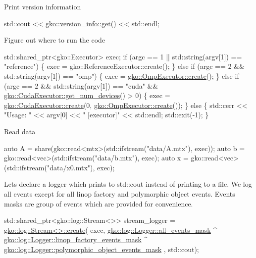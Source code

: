 Print version information


\begin{DoxyCode}
std::cout << \hyperlink{classgko_1_1version__info_a6daeb8a087cfb57fa055526fc133d8eb}{gko::version\_info::get}() << std::endl;
\end{DoxyCode}


Figure out where to run the code


\begin{DoxyCode}
std::shared\_ptr<gko::Executor> exec;
\textcolor{keywordflow}{if} (argc == 1 || std::string(argv[1]) == \textcolor{stringliteral}{"reference"}) \{
    exec = gko::ReferenceExecutor::create();
\} \textcolor{keywordflow}{else} \textcolor{keywordflow}{if} (argc == 2 && std::string(argv[1]) == \textcolor{stringliteral}{"omp"}) \{
    exec = \hyperlink{classgko_1_1OmpExecutor_a33ca05fdd0fc928ee262fc9425304874}{gko::OmpExecutor::create}();
\} \textcolor{keywordflow}{else} \textcolor{keywordflow}{if} (argc == 2 && std::string(argv[1]) == \textcolor{stringliteral}{"cuda"} &&
           \hyperlink{classgko_1_1CudaExecutor_aef0258494d14de0e56149b920c5173e5}{gko::CudaExecutor::get\_num\_devices}() > 0) \{
    exec = \hyperlink{classgko_1_1CudaExecutor_a2718a92034350650ef406ffdb60db090}{gko::CudaExecutor::create}(0, 
      \hyperlink{classgko_1_1OmpExecutor_a33ca05fdd0fc928ee262fc9425304874}{gko::OmpExecutor::create}());
\} \textcolor{keywordflow}{else} \{
    std::cerr << \textcolor{stringliteral}{"Usage: "} << argv[0] << \textcolor{stringliteral}{" [executor]"} << std::endl;
    std::exit(-1);
\}
\end{DoxyCode}


Read data


\begin{DoxyCode}
\textcolor{keyword}{auto} A = share(gko::read<mtx>(std::ifstream(\textcolor{stringliteral}{"data/A.mtx"}), exec));
\textcolor{keyword}{auto} b = gko::read<vec>(std::ifstream(\textcolor{stringliteral}{"data/b.mtx"}), exec);
\textcolor{keyword}{auto} x = gko::read<vec>(std::ifstream(\textcolor{stringliteral}{"data/x0.mtx"}), exec);
\end{DoxyCode}


Let\textquotesingle{}s declare a logger which prints to std\+::cout instead of printing to a file. We log all events except for all linop factory and polymorphic object events. Events masks are group of events which are provided for convenience.


\begin{DoxyCode}
std::shared\_ptr<gko::log::Stream<>> stream\_logger =
    \hyperlink{classgko_1_1log_1_1Stream_a71f96d3f1cd7c03875476cd8db98145b}{gko::log::Stream<>::create}(
        exec,
        \hyperlink{classgko_1_1log_1_1Logger_a02534863a2d2f92dfeb2c39038365532}{gko::log::Logger::all\_events\_mask} ^
            \hyperlink{classgko_1_1log_1_1Logger_ad6fb77d4d5610bc7299087f7149a7f16}{gko::log::Logger::linop\_factory\_events\_mask} ^
            \hyperlink{classgko_1_1log_1_1Logger_a5fb997f1c06c0602103d8dab616a96bc}{gko::log::Logger::polymorphic\_object\_events\_mask}
      ,
        std::cout);
\end{DoxyCode}


